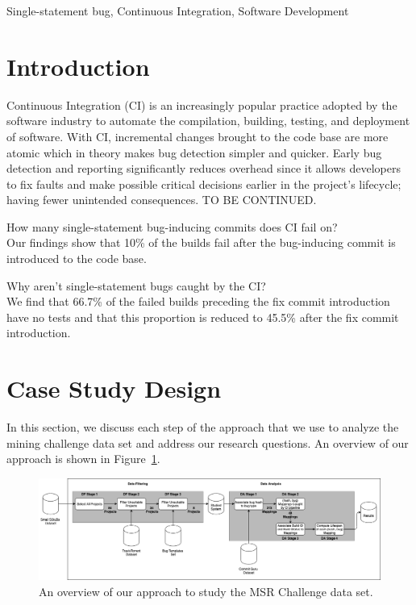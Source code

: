 \documentclass[10pt,conference]{IEEEtran}
\begin{document}
\begin{IEEEkeywords}
	Single-statement bug, Continuous Integration, Software Development
\end{IEEEkeywords}

\section{Introduction}
Continuous Integration (CI) is an increasingly popular practice adopted by the software industry to automate the compilation, building, testing, and deployment of software. With CI, incremental changes brought to the code base are more atomic which in theory makes bug detection simpler and quicker. Early bug detection and reporting significantly reduces overhead since it allows developers to fix faults and make possible critical decisions earlier in the project's lifecycle; having fewer unintended consequences. TO BE CONTINUED.

\begin{questions}
    \item How many single-statement bug-inducing commits does CI fail on? \\ Our findings show that 10\% of the builds fail after the bug-inducing commit is introduced to the code base. 
\end{questions}
\begin{questions}[resume]
    \item Why aren't single-statement bugs caught by the CI? \\ We find that 66.7\% of the failed builds preceding the fix commit introduction have no tests and that this proportion is reduced to 45.5\% after the fix commit introduction. 
\end{questions}

\section{Case Study Design}
In this section, we discuss each step of the approach that we use to analyze the mining challenge data set and address our research questions. An overview of our approach is shown in Figure~\ref{fig:process}.

\begin{figure}[t]
\centering
\includegraphics[width=\linewidth]{process.png}
\caption{An overview of our approach to study the MSR Challenge data set.}
\label{fig:process}
\end{figure}
\end{document}
